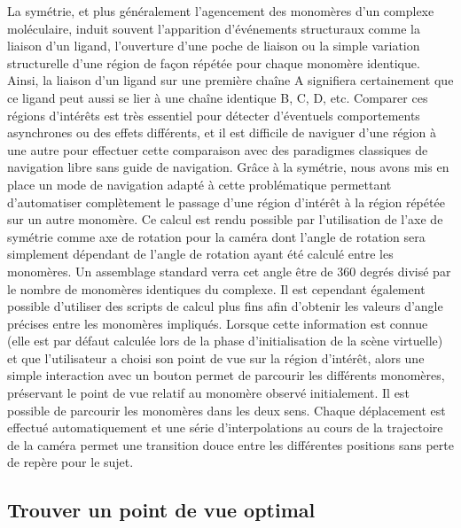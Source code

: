 La symétrie, et plus généralement l'agencement des monomères d'un complexe moléculaire, induit souvent l'apparition d'événements structuraux comme la liaison d'un ligand, l'ouverture d'une poche de liaison ou la simple variation structurelle d'une région de façon répétée pour chaque monomère identique. Ainsi, la liaison d'un ligand sur une première chaîne A signifiera certainement que ce ligand peut aussi se lier à une chaîne identique B, C, D, etc. Comparer ces régions d'intérêts est très essentiel pour détecter d'éventuels comportements asynchrones ou des effets différents, et il est difficile de naviguer d'une région à une autre pour effectuer cette comparaison avec des paradigmes classiques de navigation libre sans guide de navigation. Grâce à la symétrie, nous avons mis en place un mode de navigation adapté à cette problématique permettant d'automatiser complètement le passage d'une région d'intérêt à la région répétée sur un autre monomère. Ce calcul est rendu possible par l'utilisation de l'axe de symétrie comme axe de rotation pour la caméra dont l'angle de rotation sera simplement dépendant de l'angle de rotation ayant été calculé entre les monomères. Un assemblage standard verra cet angle être de 360 degrés divisé par le nombre de monomères identiques du complexe. Il est cependant également possible d'utiliser des scripts de calcul plus fins afin d'obtenir les valeurs d'angle précises entre les monomères impliqués. Lorsque cette information est connue (elle est par défaut calculée lors de la phase d'initialisation de la scène virtuelle) et que l'utilisateur a choisi son point de vue sur la région d'intérêt, alors une simple interaction avec un bouton permet de parcourir les différents monomères, préservant le point de vue relatif au monomère observé  initialement. Il est possible de parcourir les monomères dans les deux sens. Chaque déplacement est effectué automatiquement et une série d'interpolations au cours de la trajectoire de la caméra permet une transition douce entre les différentes positions sans perte de repère pour le sujet.

\subsection{Trouver un point de vue optimal}

